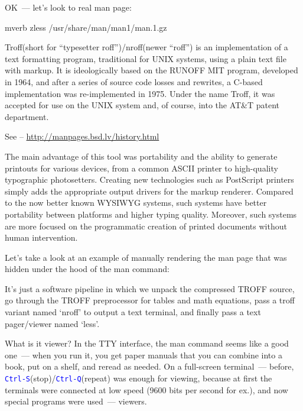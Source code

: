 \documentclass[12pt]{report}
\newcommand{\cmd}[1]{\textcolor{blue}{\tt #1}}
\begin{document}
OK~--- let's look to real man page:
\begin{code}{mverb}
zless /usr/share/man/man1/man.1.gz
\end{code}

Troff(short for ``typesetter roff'')/nroff(newer ``roff'') is an implementation
of a text formatting program, traditional for UNIX systems, using a plain text
file with markup. It is ideologically based on the RUNOFF MIT program,
developed in 1964, and after a series of source code losses and rewrites,
a C-based implementation was re-implemented in 1975. Under the name Troff,
it was accepted for use on the UNIX system and, of course,
into the AT\&T patent department.

See -- \href{http://manpages.bsd.lv/history.html}{http://manpages.bsd.lv/history.html}

The main advantage of this tool was portability and the ability to generate
printouts for various devices, from a common ASCII printer to high-quality
typographic photosetters. Creating new technologies such as PostScript printers
simply adds the appropriate output drivers for the markup renderer.
Compared to the now better known WYSIWYG systems, such systems have better
portability between platforms and higher typing quality. Moreover, such systems
are more focused on the programmatic creation of printed documents
without human intervention.

Let's take a look at an example of manually rendering the man page that
was hidden under the hood of the man command:

It's just a software pipeline in which we unpack the compressed TROFF source,
go through the TROFF preprocessor for tables and math equations,
pass a troff variant named `nroff' to output a text terminal, and finally
pass a text pager/viewer named `less'.

What is it viewer? In the TTY interface, the man command seems like
a good one~--- when you run it, you get paper manuals that you can combine
into a book, put on a shelf, and reread as needed. On a full-screen terminal~---
before, \cmd{Ctrl-S}(stop)/\cmd{Ctrl-Q}(repeat) was enough for viewing,
because at first the terminals were connected at low speed (9600 bits per
second for ex.), and now special programs were used~--- viewers.
\end{document}
